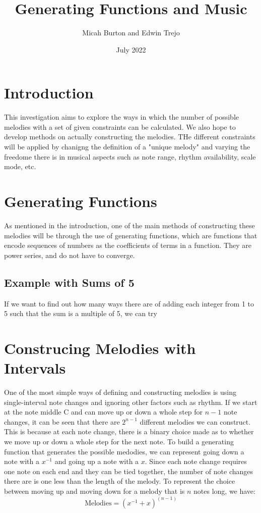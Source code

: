 \documentclass{article}
\title{Generating Functions and Music}
\author{Micah Burton and Edwin Trejo}
\date{July 2022}
\begin{document}
\maketitle

\section{Introduction}

    This investigation aims to explore the ways in which the number of possible melodies with a set of given constraints can be calculated. We also hope to develop methods on actually constructing the melodies. THe different constraints will be applied by 
    chanigng the definition of a "unique melody" and varying the freedome there is in musical aspects such as note range, rhythm availability, scale mode, etc. 

\section{Generating Functions}
    As mentioned in the introduction, one of the main methods of constructing these melodies will be through the use of generating functions, which are functions that encode sequences of numbers as the coefficients of terms in a function. 
    They are power series, and do not have to converge. 

\subsection{Example with Sums of 5} 
If we want to find out how many ways there are of adding each integer from 1 to 5 such that the sum is a multiple of 5, we can try 

\section{Construcing Melodies with Intervals}
One of the most simple ways of defining and constructing melodies is using single-interval note changes and ignoring other factors such as rhythm. If we start at the note middle C and can move up or down a whole step for \(n-1\) note changes, it can be seen that 
there are \(2^{n-1}\) different melodies we can construct. This is because at each note change, there is a binary choice made as to whether we move up or down a whole step for the next note. To build a generating function that generates the possible medodies, we can 
represent going down a note with a \(x^{-1}\) and going up a note with a \(x\). Since each note change requires one note on each end and they can be tied together, the number of note changes there are is one less than the length of the melody. To represent the 
choice between moving up and moving down for a melody that is \(n\) notes long, we have:
\begin{equation}
    \mbox{Melodies} = (x^{-1} + x)^(n-1)
\end{equation}
\end{document}
